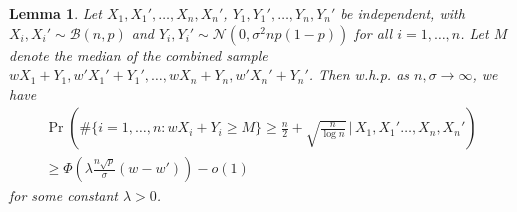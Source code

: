 \documentclass{article}
\newtheorem{lemma}[theorem]{Lemma}
\theoremstyle{remark}
\newcommand{\1}{\mathbbm{1}}
\begin{document}
\begin{lemma} \label{lemma:first-round}
    Let $X_1, X_1', \ldots, X_n, X_n'$, $Y_1, Y_1', \ldots, Y_n, Y_n'$ be independent, with $X_i, X_i' \sim \mathcal B(n, p)$ and $Y_i, Y_i' \sim \mathcal N(0, \sigma^2 np(1-p))$ for all $i=1,\ldots, n$. Let $M$ denote the median of the combined sample $w X_1 + Y_1, w' X_1' + Y_1', \ldots, wX_n + Y_n, w'X_n' + Y_n'$. Then w.h.p. as $n, \sigma \to \infty$, we have 
    \begin{align*}
        \Pr\left(\#\{i=1,\ldots, n\colon wX_i + Y_i \ge M\} \ge \frac{n}{2} + \sqrt{\frac{n}{\log n}} \,\bigg|\, X_1, X_1' \ldots, X_n, X_n'\right)\\
        \ge \Phi\left(\lambda \frac{n\sqrt{p}}{\sigma} (w - w')\right)  - o(1)
    \end{align*} for some constant $\lambda > 0$.
\end{lemma}
\end{document}
